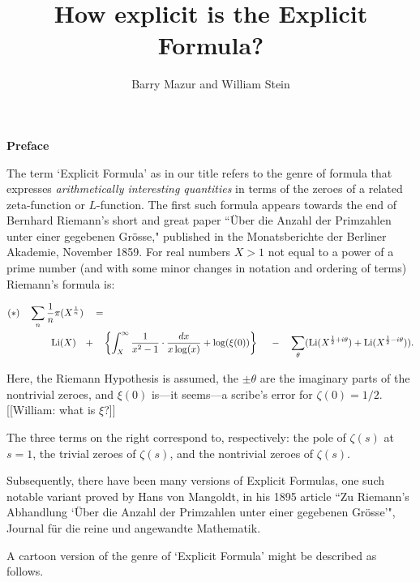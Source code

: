 \documentclass[11pt]{article}
\title{How explicit is the Explicit Formula?}
\author{Barry Mazur and William Stein}
\theoremstyle{plain}
\theoremstyle{definition}
\numberwithin{equation}{section}
\numberwithin{figure}{section}
\numberwithin{table}{section}
\begin{document}
\maketitle


\vskip10pt
\centerline{\bf Preface}
\vskip10pt

The  term `Explicit Formula' as in our title refers to the genre of formula that expresses {\it arithmetically interesting quantities} in terms of the zeroes of  a related zeta-function or $L$-function.  The first such formula appears towards the end of Bernhard Riemann's short and great paper  ``\"{U}ber die Anzahl der Primzahlen unter einer
gegebenen Gr\"{o}sse," published in the
Monatsberichte der Berliner Akademie,
November 1859.  For real numbers $X>1$ not equal to a power of a prime number  (and with some minor changes in notation and ordering  of terms) Riemann's formula is:


\begin{align*}
{\bf (*)}\ \ \ \sum_{n} {\frac{1}{n}}\pi(X^{{\frac{1}{n}}}) \ \ \ &= \\
  {\rm Li}(X) \ \ \  +& \ \ \  \left\{ \int_X^{\infty}{\frac{1}{x^2-1}}\cdot {\frac{dx}{x\log(x)}} +\log(\xi(0))\right\}\ \ \ \     - \ \ \   \sum_\theta({\rm Li}(X^{{\frac{1}{2}}+i\theta})+ {\rm Li}(X^{{\frac{1}{2}}-i\theta})).
\end{align*}


Here,  the Riemann Hypothesis is assumed, the $\pm \theta$ are the imaginary parts of the nontrivial zeroes, and  $\xi(0)$ is---it seems---a scribe's error for  $\zeta(0)=1/2$. [[William: what is $\xi$?]]

The three terms on the right correspond to, respectively:  the pole of $\zeta(s)$ at $s=1$, the trivial zeroes of $\zeta(s)$, and the nontrivial zeroes of $\zeta(s)$.


 Subsequently, there have been many versions of Explicit Formulas, one such notable variant  proved by Hans von  Mangoldt, in his 1895 article  ``Zu Riemann's Abhandlung `\"{U}ber die Anzahl der Primzahlen unter einer gegebenen Gr\"{o}sse'", Journal f\"{u}r die reine und angewandte Mathematik.

 A  cartoon version of the genre of `Explicit Formula' might be described as follows.
\end{document}
